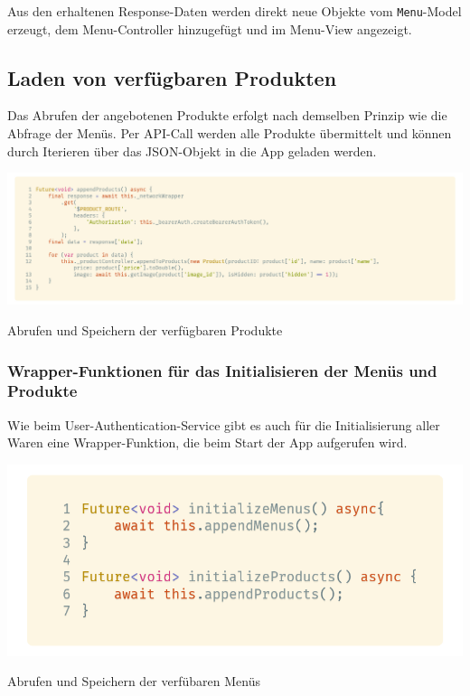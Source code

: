 Aus den erhaltenen Response-Daten werden direkt neue Objekte vom \lstinline{Menu}-Model erzeugt,
dem Menu-Controller hinzugefügt und im Menu-View angezeigt.

\subsection{Laden von verfügbaren Produkten}

Das Abrufen der angebotenen Produkte erfolgt nach demselben Prinzip wie die Abfrage der Menüs.
Per API-Call werden alle Produkte übermittelt und können durch Iterieren über das JSON-Objekt
in die App geladen werden.

\begin{code}
    \centering
    \includegraphics[width=1\textwidth]{images/Client/services/fetch-orderables/appendProducts.png}
    \vspace{-25pt}
    \caption{Abrufen und Speichern der verfügbaren Produkte}
\end{code}

\subsubsection{Wrapper-Funktionen für das Initialisieren der Menüs und Produkte}

Wie beim User-Authentication-Service gibt es auch für die Initialisierung aller Waren eine Wrapper-Funktion,
die beim Start der App aufgerufen wird.

\begin{code}
    \centering
    \includegraphics[width=1\textwidth]{images/Client/services/fetch-orderables/wrapperFunction.png}
    \vspace{-25pt}
    \caption{Abrufen und Speichern der verfübaren Menüs}
\end{code}